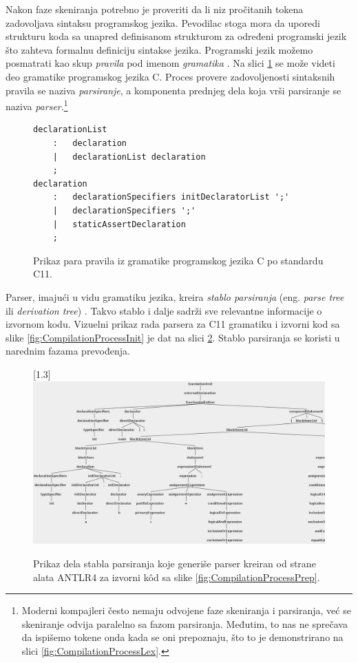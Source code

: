 Nakon faze skeniranja potrebno je proveriti da li niz pročitanih tokena zadovoljava sintaksu programskog jezika. Pevodilac stoga mora da uporedi strukturu koda sa unapred definisanom strukturom za određeni programski jezik što zahteva formalnu definiciju sintakse jezika. Programski jezik možemo posmatrati kao skup \emph{pravila} pod imenom \emph{gramatika} \cite{AutomataTheory}. Na slici \ref{fig:CompilationProcessGram} se može videti deo gramatike programskog jezika C. Proces provere zadovoljenosti sintaksnih pravila se naziva \emph{parsiranje}, a komponenta prednjeg dela koja vrši parsiranje se naziva \emph{parser}.\footnote{Moderni kompajleri često nemaju odvojene faze skeniranja i parsiranja, već se skeniranje odvija paralelno sa fazom parsiranja. Međutim, to nas ne sprečava da ispišemo tokene onda kada se oni prepoznaju, što to je demonstrirano na slici \ref{fig:CompilationProcessLex}.}

\begin{figure}[h!]
\begin{lstlisting}[language={}]
declarationList
    :   declaration
    |   declarationList declaration
    ;
declaration
    :   declarationSpecifiers initDeclaratorList ';'
    | 	declarationSpecifiers ';'
    |   staticAssertDeclaration
    ;
\end{lstlisting}
\caption{Prikaz para pravila iz gramatike programskog jezika C po standardu C11.}
\label{fig:CompilationProcessGram}
\end{figure}

Parser, imajući u vidu gramatiku jezika, kreira \emph{stablo parsiranja} (eng. \emph{parse tree} ili \emph{derivation tree}) \cite{AutomataTheory}. Takvo stablo i dalje sadrži sve relevantne informacije o izvornom kodu. Vizuelni prikaz rada parsera za C11 gramatiku i izvorni kod sa slike \ref{fig:CompilationProcessInit} je dat na slici \ref{fig:CompilationProcessPars}. Stablo parsiranja se koristi u narednim fazama prevođenja.

\begin{figure}[h!]
\centering
\scalebox{0.95}[1.3] {
    \includegraphics[width=\textwidth]{images/parse_tree.png}
}
\caption{Prikaz dela stabla parsiranja koje generiše parser kreiran od strane alata ANTLR4 \cite{ANTLR} za izvorni k\^od sa slike \ref{fig:CompilationProcessPrep}.}
\label{fig:CompilationProcessPars}
\end{figure}

